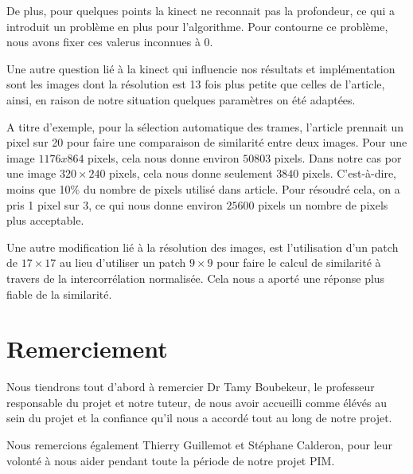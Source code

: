 \documentclass[a4paper,12pt]{article}
\begin{document}
De plus, pour quelques points la kinect ne reconnait pas la
profondeur, ce qui a introduit un problème en plus pour l'algorithme. 
Pour contourne ce problème, nous avons fixer ces valerus inconnues à
0. 

Une autre question lié à la kinect qui influencie nos résultats et
implémentation sont les images dont la résolution est 13 fois plus
petite que celles de l'article, ainsi, en raison de notre situation
quelques paramètres on été adaptées.

A titre d'exemple, pour la sélection automatique des trames, l'article
prennait un pixel sur 20 pour faire une comparaison de similarité
entre deux images. Pour une image $1176 x 864$ pixels, cela nous donne
environ $50803$ pixels. Dans notre cas por une image $320 \times 240$ pixels,
cela nous donne seulement $3840$ pixels. C'est-à-dire, moins que 10\% du
nombre de pixels utilisé dans article. Pour résoudré cela, on a pris 1
pixel sur 3, ce qui nous donne environ $25600$ pixels un nombre de
pixels plus acceptable.

Une autre modification lié à la résolution des images, est
l'utilisation d'un patch de $17 \times 17$ au lieu d'utiliser un patch
$9 \times 9$ pour faire le calcul de similarité à travers de la
intercorrélation normalisée. Cela nous a aporté une réponse plus
fiable de la similarité.   


\section{Remerciement}
Nous tiendrons tout d’abord à remercier Dr Tamy Boubekeur, le
professeur responsable du projet et notre tuteur, de nous avoir
accueilli comme élévés au sein du projet et la confiance qu’il nous a
accordé tout au long de notre projet. 

Nous remercions également Thierry Guillemot et Stéphane Calderon, pour
leur volonté à nous aider pendant toute la période de notre projet PIM. 

\nocite{Beeler:2010:HSC:1778765.1778777}

\begin{small}
  
\end{small}
\section*{}
\end{document}

